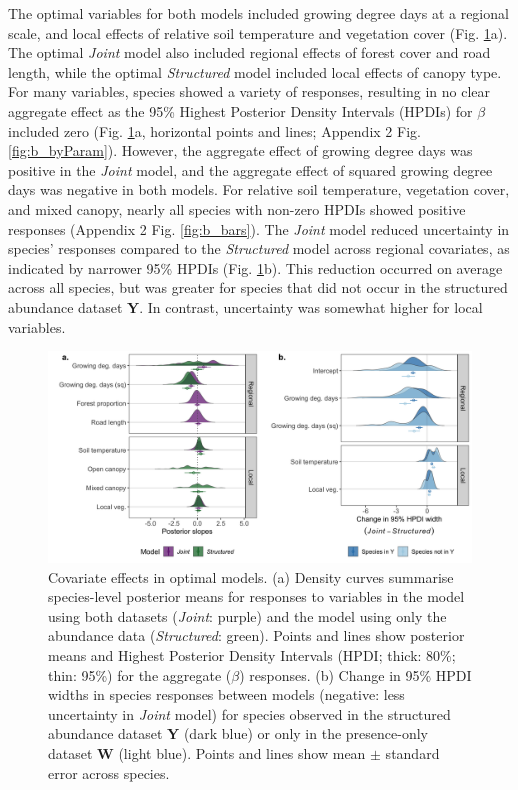 \documentclass[preprint,review,times,12pt,3p]{elsarticle}
\begin{document}
The optimal variables for both models included growing degree days at a regional scale, and local effects of relative soil temperature and vegetation cover (Fig. \ref{fig:slope_means}a). The optimal \emph{Joint} model also included regional effects of forest cover and road length, while the optimal \emph{Structured} model included local effects of canopy type. For many variables, species showed a variety of responses, resulting in no clear aggregate effect as the 95\% Highest Posterior Density Intervals (HPDIs) for $\beta$ included zero (Fig. \ref{fig:slope_means}a, horizontal points and lines; Appendix 2 Fig. \ref{fig:b_byParam}). However, the aggregate effect of growing degree days was positive in the \emph{Joint} model, and the aggregate effect of squared growing degree days was negative in both models. For relative soil temperature, vegetation cover, and mixed canopy, nearly all species with non-zero HPDIs showed positive responses (Appendix 2 Fig. \ref{fig:b_bars}). The \emph{Joint} model reduced uncertainty in species' responses compared to the \emph{Structured} model across regional covariates, as indicated by narrower 95\% HPDIs (Fig. \ref{fig:slope_means}b). This reduction occurred on average across all species, but was greater for species that did not occur in the structured abundance dataset \textbf{Y}. In contrast, uncertainty was somewhat higher for local variables.

\begin{figure}
\centering\includegraphics[width=6in]{ms/1_Ecography/1/figs/slope_means+HDI.png}
\caption{\label{fig:slope_means} Covariate effects in optimal models. (a) Density curves summarise species-level posterior means for responses to variables in the model using both datasets (\emph{Joint}: purple) and the model using only the abundance data (\emph{Structured}: green). Points and lines show posterior means and Highest Posterior Density Intervals (HPDI; thick: 80\%; thin: 95\%) for the aggregate ($\beta$) responses. (b) Change in 95\% HPDI widths in species responses between models (negative: less uncertainty in \emph{Joint} model) for species observed in the structured abundance dataset \textbf{Y} (dark blue) or only in the presence-only dataset \textbf{W} (light blue). Points and lines show mean $\pm$ standard error across species. }
\end{figure}
\end{document}
